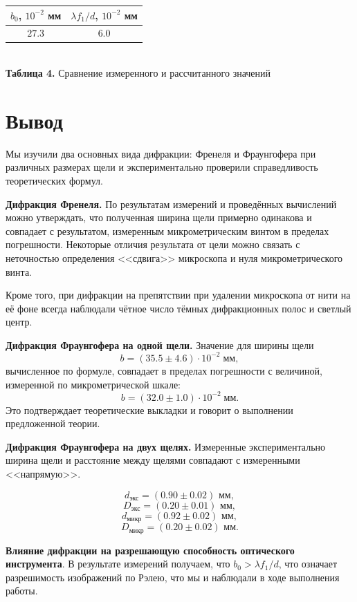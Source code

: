 \documentclass[a4paper,12pt]{article} %
\begin{document}
\begin{center}
\begin{tabular}{|c|c|}\hline
$ b_{0} $, $10^{-2}$ мм & $ \lambda f_1 /d $, $10^{-2}$ мм \\\hline
$ 27.3 $ & $ 6.0 $ \\\hline
\end{tabular} \\
\hfill \break \textbf {Таблица 4.} Сравнение измеренного и рассчитанного значений \\
\end{center}

\section{Вывод}
\hfill \break Мы изучили два основных вида дифракции: Френеля и Фраунгофера при различных размерах щели и экспериментально проверили справедливость теоретических формул. 

\hfill \break \textbf{Дифракция Френеля.} По результатам измерений и проведённых вычислений можно утверждать, что полученная ширина щели примерно одинакова и совпадает с результатом, измеренным микрометрическим винтом в пределах погрешности. Некоторые отличия результата от цели можно связать с неточностью определения <<сдвига>> микроскопа и нуля микрометрического винта. 

\hfill \break Кроме того, при дифракции на препятствии при удалении микроскопа от нити на её фоне всегда наблюдали чётное число тёмных дифракционных полос и светлый центр.

\hfill \break \textbf{Дифракция Фраунгофера на одной щели.} Значение для ширины щели
$$
\boxed{b =  (35.5 \pm 4.6) \cdot 10^{-2} \; \text{мм},} 
$$
\hfill \break вычисленное по формуле, совпадает в пределах погрешности с величиной, измеренной по микрометрической шкале:
$$
\boxed{b =  (32.0 \pm 1.0) \cdot 10^{-2} \; \text{мм}.} 
$$
\hfill \break Это подтверждает теоретические выкладки и говорит о выполнении предложенной теории.

\hfill \break \textbf{Дифракция Фраунгофера на двух щелях.} Измеренные экспериментально ширина щели и расстояние между щелями совпадают с измеренными <<напрямую>>.

\[ \boxed{d_\text{экс} = (0.90 \pm 0.02) \text{ мм},} \]
\[ \boxed{D_\text{экс} = (0.20 \pm 0.01) \text{ мм},} \]
\[ \boxed{d_\text{микр} = (0.92 \pm 0.02) \text{ мм},} \]
\[ \boxed{D_\text{микр} = (0.20 \pm 0.02) \text{ мм}.} \]

\hfill \break \textbf{Влияние дифракции на разрешающую способность оптического инструмента}. В результате измерений получаем, что $b_0 > \lambda f_1/d$, что означает разрешимость изображений по Рэлею, что мы и наблюдали в ходе выполнения работы.
\end{document}

